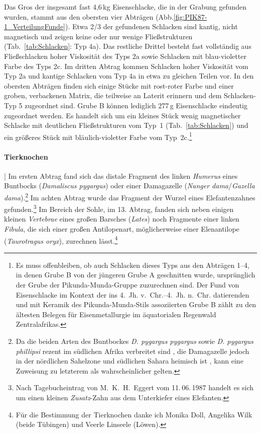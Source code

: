 Das Gros der insgesamt fast 4,6\,kg Eisenschlacke, die in der Grabung gefunden wurden, stammt aus den obersten vier Abträgen (Abb.\ref{fig:PIK87-1_VerteilungFunde}). Etwa 2/3 der gefundenen Schlacken sind kantig, nicht magnetisch und zeigen keine oder nur wenige Fließstrukturen (Tab.~\ref{tab:Schlacken}: Typ 4a). Das restliche Drittel besteht fast vollständig aus Fließschlacken hoher Viskosität des Typs 2a sowie Schlacken mit blau-violetter Farbe des Typs 2c. Im dritten Abtrag kommen Schlacken hoher Viskosität vom Typ 2a und kantige Schlacken vom Typ 4a in etwa zu gleichen Teilen vor. In den obersten Abträgen finden sich einige Stücke mit rost-roter Farbe und einer groben, verbackenen Matrix, die teilweise an Laterit erinnern und dem Schlacken-Typ 5 zugeordnet sind. Grube B können lediglich 277\,g Eisenschlacke eindeutig zugeordnet werden. Es handelt sich um ein kleines Stück wenig magnetischer Schlacke mit deutlichen Fließstrukturen vom Typ~1 (Tab.~\ref{tab:Schlacken}) und ein größeres Stück mit bläulich-violetter Farbe vom Typ~2c.\footnote{Es muss offenbleiben, ob auch Schlacken dieses Typs aus den Abträgen 1--4, in denen Grube B von der jüngeren Grube A geschnitten wurde, ursprünglich der Grube der Pikunda-Munda-Gruppe zuzurechnen sind. Der Fund von Eisenschlacke im Kontext der ins 4.~Jh. v.~Chr.--4.~Jh. n.~Chr. datierenden und mit Keramik des Pikunda-Munda-Stils assoziierten Grube B zählt zu den ältesten Belegen für Eisenmetallurgie im äquatorialen Regenwald Zentralafrikas.}

\paragraph{Tierknochen}\hspace{-.5em}|\hspace{.5em}%
Im ersten Abtrag fand sich das distale Fragment des linken \textit{Humerus} eines Buntbocks (\textit{Damaliscus pygargus}) oder einer Damagazelle (\textit{Nanger dama}/\textit{Gazella dama}).\footnote{Da die beiden Arten des Buntbockes \textit{D. pygargus pygargus} sowie \textit{D. pygargus phillipsi} rezent im südlichen Afrika verbreitet sind \parencites[siehe][42 Abb.~28]{Boshoff.2016}[2\,f. Abb.~1, Tab.~1, Abb.~2]{Radloff.2016}, die Damagazelle jedoch in der nördlichen Sahelzone und südlichen Sahara heimisch ist \parencite[siehe][2 Abb.~1]{Senn.2014}, kann eine Zuweisung zu letzterem als wahrscheinlicher gelten.} Im achten Abtrag wurde das Fragment der Wurzel eines Elefantenzahnes gefunden.\footnote{Nach Tagebucheintrag von M.~K.~H.~Eggert vom 11.\,06.\,1987 handelt es sich um einen kleinen \textit{Zusatz}-Zahn aus dem Unterkiefer eines Elefanten.} Im Bereich der Sohle, im 13. Abtrag, fanden sich neben einigen kleinen \textit{Vertebrae} eines großen Barsches (\textit{Lates}) noch Fragmente einer linken \textit{Fibula}, die sich einer großen Antilopenart, möglicherweise einer Elenantilope (\textit{Taurotragus oryx}), zurechnen lässt.\footnote{Für die Bestimmung der Tierknochen danke ich Monika Doll, Angelika Wilk (beide Tübingen) und Veerle Linseele (Löwen).}


